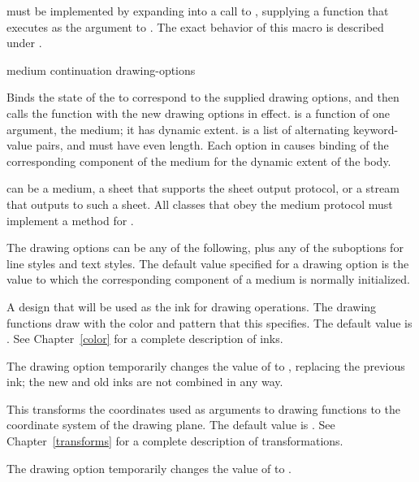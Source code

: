  must be implemented by expanding into a call to
, supplying a function that executes 
as the  argument to .  The exact
behavior of this macro is described under .

 {medium continuation \rest drawing-options}

Binds the state of the   to correspond to the supplied
drawing options, and then calls the function  with the new
drawing options in effect.   is a function of one argument,
the medium; it has dynamic extent.   is a list of
alternating keyword-value pairs, and must have even length.  Each option in
 causes binding of the corresponding component of the
medium for the dynamic extent of the body.

 can be a medium, a sheet that supports the sheet output protocol,
or a stream that outputs to such a sheet.  All classes that obey the medium
protocol must implement a method for .

The drawing options can be any of the following, plus any of the suboptions for
line styles and text styles.  The default value specified for a drawing option
is the value to which the corresponding component of a medium is normally
initialized.


A design that will be used as the ink for drawing operations.  The drawing
functions draw with the color and pattern that this specifies.  The default
value is .  See Chapter~\ref{color} for a complete
description of inks.

The   drawing option temporarily changes the value of
 to , replacing the previous ink; the
new and old inks are not combined in any way.



This transforms the coordinates used as arguments to drawing functions to the
coordinate system of the drawing plane.  The default value is
.  See Chapter~\ref{transforms} for a complete
description of transformations.

The   drawing option temporarily changes the
value of to
.


